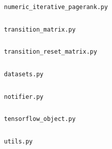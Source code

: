 \documentclass{subfiles}
\begin{document}
    \begin{figure}
      \centering
      \inputminted[linenos]{python}{../src/pagerank/numeric_iterative_pagerank.py}
      \caption{\texttt{numeric\_iterative\_pagerank.py}}
      \label{code:numeric_iterative_pagerank}
    \end{figure}

    \begin{figure}
      \centering
      \inputminted[linenos]{python}{../src/pagerank/transition_matrix.py}
      \caption{\texttt{transition\_matrix.py}}
      \label{code:transition_matrix}
    \end{figure}

    \begin{figure}
      \centering
      \inputminted[linenos]{python}{../src/pagerank/transition_reset_matrix.py}
      \caption{\texttt{transition\_reset\_matrix.py}}
      \label{code:transition_reset_matrix}
    \end{figure}

    \begin{figure}
      \centering
      \inputminted[linenos]{python}{../src/utils/datasets.py}
      \caption{\texttt{datasets.py}}
      \label{code:datasets}
    \end{figure}


    \begin{figure}
      \centering
      \inputminted[linenos]{python}{../src/utils/notifier.py}
      \caption{\texttt{notifier.py}}
      \label{code:notifier}
    \end{figure}

    \begin{figure}
      \centering
      \inputminted[linenos]{python}{../src/utils/tensorflow_object.py}
      \caption{\texttt{tensorflow\_object.py}}
      \label{code:tensorflow_object}
    \end{figure}

    \begin{figure}
      \centering
      \inputminted[linenos]{python}{../src/utils/utils.py}
      \caption{\texttt{utils.py}}
      \label{code:utils}
    \end{figure}
\end{document}
